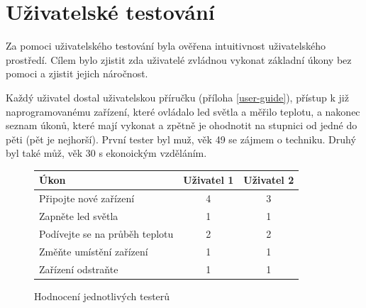 

\section{Uživatelské testování}
Za pomoci uživatelského testování byla ověřena intuitivnost uživatelského prostředí. Cílem bylo zjistit zda uživatelé zvládnou vykonat základní úkony bez pomoci a zjistit jejich náročnost.

Každý uživatel dostal uživatelskou příručku (příloha \ref{user-guide}), přístup k již naprogramovanému zařízení, které ovládalo led světla a měřilo teplotu, a nakonec seznam úkonů, které mají vykonat a zpětně je ohodnotit na stupnici od jedné do pěti (pět je nejhorší). První tester byl muž, věk 49 se zájmem o techniku. Druhý byl také můž, věk 30 s ekonoickým vzděláním.


\begin{figure}
    \centering
    \begin{tabular}{ | l | c | c | }
        \hline
        Úkon                           & Uživatel 1 & Uživatel 2 \\
        \hline
        Připojte nové zařízení         & 4          & 3          \\
        \hline
        Zapněte led světla             & 1          & 1          \\
        \hline
        Podívejte se na průběh teplotu & 2          & 2          \\
        \hline
        Změňte umístění zařízení       & 1          & 1          \\
        \hline
        Zařízení odstraňte             & 1          & 1          \\
        \hline
    \end{tabular}
    \caption{Hodnocení jednotlivých testerů}
\end{figure}

